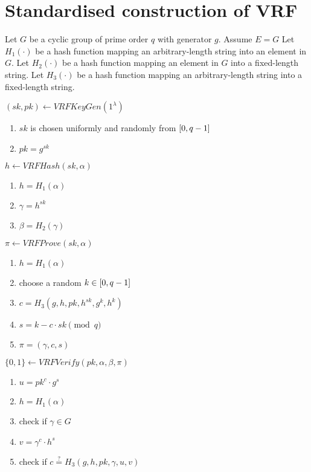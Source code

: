 \section{Standardised construction of VRF}

Let $G$ be a cyclic group of prime order $q$ with generator $g$. Assume $E = G$
Let $H_1(\cdot)$ be a hash function mapping an arbitrary-length string into an element in $G$.
Let $H_2(\cdot)$ be a hash function mapping an element in $G$ into a fixed-length string.
Let $H_3(\cdot)$ be a hash function mapping an arbitrary-length string into a fixed-length string.

$(sk, pk) \leftarrow VRFKeyGen(1^{\lambda})$
\begin{enumerate}
    \item $sk$ is chosen uniformly and randomly from $\interval{0}{q-1}$
    \item $pk = g^{sk}$
\end{enumerate}

$h \leftarrow VRFHash(sk, \alpha)$
\begin{enumerate}
    \item $h = H_{1}(\alpha)$
    \item $\gamma = h^{sk}$
    \item $\beta = H_{2}(\gamma)$
\end{enumerate}

$\pi \leftarrow VRFProve(sk, \alpha)$
\begin{enumerate}
    \item $h = H_{1}(\alpha)$
    \item choose a random $k \in \interval{0}{q-1}$
    \item $c = H_{3}(g, h, pk, h^{sk}, g^{k}, h^{k})$
    \item $s = k - c \cdot sk \pmod{q}$
    \item $\pi = (\gamma, c, s)$
\end{enumerate}

$\{0, 1\} \leftarrow VRFVerify(pk, \alpha, \beta, \pi)$
\begin{enumerate}
    \item $u = pk^{c} \cdot g^{s}$
    \item $h = H_{1}(\alpha)$
    \item check if $\gamma \in G$
    \item $v = \gamma^{c} \cdot h^{s}$
    \item check if $c \stackrel{?}{=} H_{3}(g, h, pk, \gamma, u, v)$
\end{enumerate}
